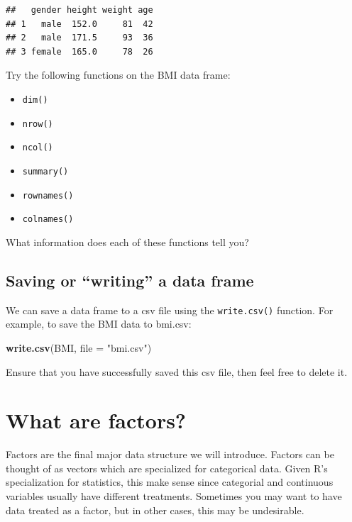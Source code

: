 \documentclass[
]{book}
\newenvironment{Shaded}{\begin{snugshade}}{\end{snugshade}}
\newcommand{\AttributeTok}[1]{\textcolor[rgb]{0.13,0.29,0.53}{#1}}
\newcommand{\FunctionTok}[1]{\textcolor[rgb]{0.13,0.29,0.53}{\textbf{#1}}}
\newcommand{\NormalTok}[1]{#1}
\newcommand{\StringTok}[1]{\textcolor[rgb]{0.31,0.60,0.02}{#1}}
\providecommand{\tightlist}{%
  \setlength{\itemsep}{0pt}\setlength{\parskip}{0pt}}
\begin{document}
\begin{verbatim}
##   gender height weight age
## 1   male  152.0     81  42
## 2   male  171.5     93  36
## 3 female  165.0     78  26
\end{verbatim}

Try the following functions on the BMI data frame:

\begin{itemize}
\tightlist
\item
  \texttt{dim()}
\item
  \texttt{nrow()}
\item
  \texttt{ncol()}
\item
  \texttt{summary()}
\item
  \texttt{rownames()}
\item
  \texttt{colnames()}
\end{itemize}

What information does each of these functions tell you?

\subsection*{Saving or ``writing'' a data frame}\label{saving-or-writing-a-data-frame}

We can save a data frame to a csv file using the \texttt{write.csv()} function. For example, to save the BMI data to bmi.csv:

\begin{Shaded}
\begin{Highlighting}[]
\FunctionTok{write.csv}\NormalTok{(BMI, }\AttributeTok{file =} \StringTok{"bmi.csv"}\NormalTok{)}
\end{Highlighting}
\end{Shaded}

Ensure that you have successfully saved this csv file, then feel free to delete it.

\section{What are factors?}\label{what-are-factors}

Factors are the final major data structure we will introduce. Factors can be thought of as vectors which are specialized for categorical data. Given R's specialization for statistics, this make sense since categorial and continuous variables usually have different treatments. Sometimes you may want to have data treated as a factor, but in other cases, this may be undesirable.
\end{document}
